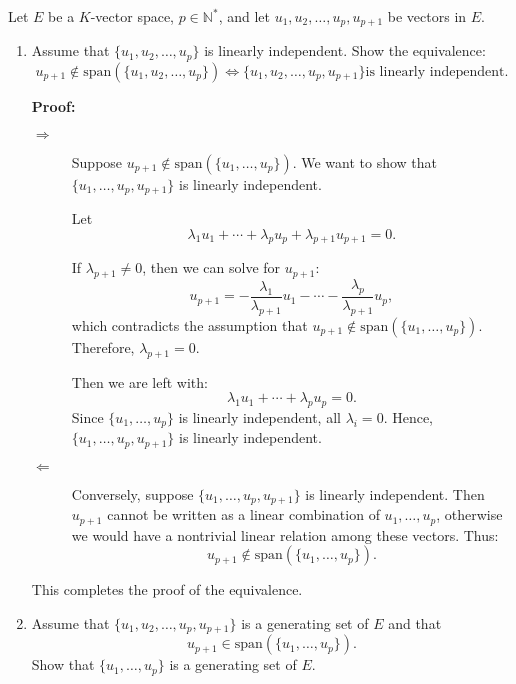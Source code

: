 \documentclass[12pt]{article}
\begin{document}
\begin{answerbox}
Let $ E $ be a $ K $-vector space, $ p \in \mathbb{N}^* $, and let $ u_1, u_2, \ldots, u_p, u_{p+1} $ be vectors in $ E $.

\begin{enumerate}
    \item Assume that $ \{u_1, u_2, \ldots, u_p\} $ is linearly independent. Show the equivalence:
    $$
    u_{p+1} \notin \text{span}(\{u_1, u_2, \ldots, u_p\}) \iff \{u_1, u_2, \ldots, u_p, u_{p+1}\} \text{is linearly independent}.
    $$

    \textbf{Proof:}
    
    \begin{description}
        \item[$\Rightarrow$] Suppose $ u_{p+1} \notin \text{span}(\{u_1, \ldots, u_p\}) $. We want to show that $ \{u_1, \ldots, u_p, u_{p+1}\} $ is linearly independent.
        
        Let 
        $$
        \lambda_1 u_1 + \cdots + \lambda_p u_p + \lambda_{p+1} u_{p+1} = 0.
        $$
        
        If $ \lambda_{p+1} \neq 0 $, then we can solve for $ u_{p+1} $:
        $$
        u_{p+1} = -\frac{\lambda_1}{\lambda_{p+1}} u_1 - \cdots - \frac{\lambda_p}{\lambda_{p+1}} u_p,
        $$
        which contradicts the assumption that $ u_{p+1} \notin \text{span}(\{u_1, \ldots, u_p\}) $. Therefore, $ \lambda_{p+1} = 0 $.

        Then we are left with:
        $$
        \lambda_1 u_1 + \cdots + \lambda_p u_p = 0.
        $$
        Since $ \{u_1, \ldots, u_p\} $ is linearly independent, all $ \lambda_i = 0 $. Hence, $ \{u_1, \ldots, u_p, u_{p+1}\} $ is linearly independent.

        \item[$\Leftarrow$] Conversely, suppose $ \{u_1, \ldots, u_p, u_{p+1}\} $ is linearly independent. Then $ u_{p+1} $ cannot be written as a linear combination of $ u_1, \ldots, u_p $, otherwise we would have a nontrivial linear relation among these vectors. Thus:
        $$
        u_{p+1} \notin \text{span}(\{u_1, \ldots, u_p\}).
        $$
    \end{description}

    This completes the proof of the equivalence.

    \item Assume that $ \{u_1, u_2, \ldots, u_p, u_{p+1}\} $ is a generating set of $ E $ and that
    $$
    u_{p+1} \in \text{span}(\{u_1, \ldots, u_p\}).
    $$
    Show that $ \{u_1, \ldots, u_p\} $ is a generating set of $ E $.


\end{enumerate}
\end{answerbox}
\end{document}

